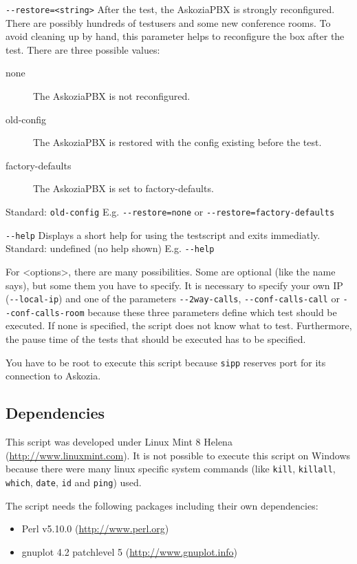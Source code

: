 \begin{description}
\item {\texttt{-{}-restore=<string>}} \newline
After the test, the AskoziaPBX is strongly reconfigured. There are possibly hundreds
of testusers and some new conference rooms. To avoid cleaning up by hand, this parameter
helps to reconfigure the box after the test. There are three possible values:
\begin{description}
	\item [none] The AskoziaPBX is not reconfigured.
	\item [old-config] The AskoziaPBX is restored with the config existing before the test.
	\item [factory-defaults] The AskoziaPBX is set to factory-defaults.
\end{description}
Standard: \texttt{old-config}
\newline E.g. \texttt{-{}-restore=none} or \texttt{-{}-restore=factory-defaults}

\item {\texttt{-{}-help}} \newline
Displays a short help for using the testscript and exits immediatly.
\newline Standard: undefined (no help shown)
\newline E.g. \texttt{-{}-help}

\end{description}

For <options>, there are many possibilities. Some are optional (like the name says), but some them you have to specify.
It is necessary to specify your own IP (\texttt{-{}-local-ip}) and one of the parameters \texttt{-{}-2way-calls},
\texttt{-{}-conf-calls-call} or \texttt{-{}-conf-calls-room} because these three parameters define which test should be
executed. If none is specified, the script does not know what to test. Furthermore, the pause time of the tests that
should be executed has to be specified.

You have to be root to execute this script because \texttt{sipp} reserves port for its connection to Askozia.

\subsection{Dependencies}%
This script was developed under Linux Mint 8 Helena (\url{http://www.linuxmint.com}).
It is not possible to execute this script on Windows because there were many linux specific system commands
(like \texttt{kill}, \texttt{killall}, \texttt{which}, \texttt{date}, \texttt{id} and \texttt{ping}) used.

The script needs the following packages including their own dependencies:
\begin{itemize}
	\item Perl v5.10.0 (\url{http://www.perl.org})
	\item gnuplot 4.2 patchlevel 5 (\url{http://www.gnuplot.info})
\end{itemize}
